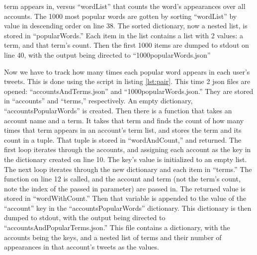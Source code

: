 \documentclass[12pt]{article}
\begin{document}
term appears in, versus ``wordList'' that counts the word's appearances over all accounts.  The 1000 most popular words are gotten by sorting ``wordList'' by value in descending order on line 38.  The sorted dictionary, now a nested list, is stored in ``popularWords.''  Each item in the list contains a list with 2 values: a term, and that term's count.  Then the first 1000 items are dumped to stdout on line 40, with the output being directed to ``1000popularWords.json''

Now we have to track how many times each popular word appears in each user's tweets.  This is done using the script in listing \ref{lst:pair}.  This time 2 json files are opened: ``accountsAndTerms.json'' and ``1000popularWords.json.'' They are stored in ``accounts'' and ``terms,'' respectively.  An empty dictionary, ``accountsPopularWords'' is created.  Then there is a function that takes an account name and a term.  It takes that term and finds the count of how many times that term appears in an account's term list, and stores the term and its count in a tuple.  That tuple is stored in ``wordAndCount,'' and returned.  The first loop iterates through the accounts, and assigning each account as the key in the dictionary created on line 10.  The key's value is initialized to an empty list.  The next loop iterates through the new dictionary and each item in ``terms.''  The function on line 12 is called, and the account and term (not the term's count, note the index of the passed in parameter) are passed in.  The returned value is stored in ``wordWithCount.''  Then that variable is appended to the value of the ``account'' key in the ``accountsPopularWords'' dictionary.  This dictionary is then dumped to stdout, with the output being directed to ``accountsAndPopularTerms.json.''  This file contains a dictionary, with the accounts being the keys, and a nested list of terms and their number of appearances in that account's tweets as the values.
\end{document}
